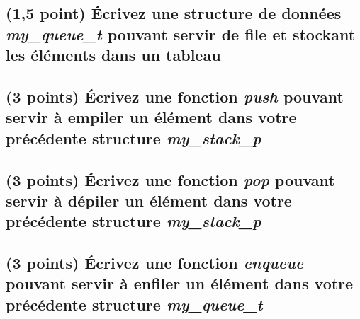 \documentclass[11pt,a4paper]{article}
\begin{document}
\bigskip

\begin{center}
\end{center}

\bigskip


\subsection{(1,5 point) \'Ecrivez une structure de données \og \textit{my\_queue\_t} \fg{} pouvant servir de file et stockant les éléments dans un tableau }

\bigskip

\begin{center}
\end{center}



\newpage

\subsection{(3 points) \'Ecrivez une fonction \og \textit{push} \fg{} pouvant servir à empiler un élément dans votre précédente structure \og \textit{my\_stack\_p} \fg{} }

\bigskip

\begin{center}

\end{center}

\newpage

\subsection{(3 points) \'Ecrivez une fonction \og \textit{pop} \fg{} pouvant servir à dépiler un élément dans votre précédente structure \og \textit{my\_stack\_p} \fg{} }

\bigskip

\begin{center}
\end{center}

\bigskip



\newpage

\subsection{(3 points) \'Ecrivez une fonction \og \textit{enqueue} \fg{} pouvant servir à enfiler un élément dans votre précédente structure \og \textit{my\_queue\_t} \fg{} }
\end{document}
